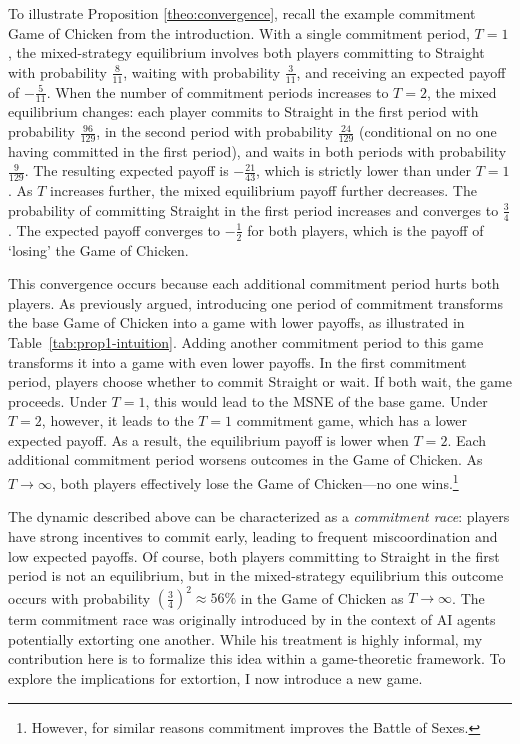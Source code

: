 \documentclass[main.tex]{subfiles}
\begin{document}
To illustrate Proposition \ref{theo:convergence}, recall the example commitment Game of Chicken from the introduction. With a single commitment period, $T = 1$, the mixed-strategy equilibrium involves both players committing to Straight with probability $\tfrac{8}{11}$, waiting with probability $\tfrac{3}{11}$, and receiving an expected payoff of $-\tfrac{5}{11}$. When the number of commitment periods increases to $T = 2$, the mixed equilibrium changes: each player commits to Straight in the first period with probability $\tfrac{96}{129}$, in the second period with probability $\tfrac{24}{129}$ (conditional on no one having committed in the first period), and waits in both periods with probability $\tfrac{9}{129}$. The resulting expected payoff is $-\tfrac{21}{43}$, which is strictly lower than under $T = 1$. As $T$ increases further, the mixed equilibrium payoff further decreases. The probability of committing Straight in the first period increases and converges to $\tfrac{3}{4}$. The expected payoff converges to $-\tfrac{1}{2}$ for both players, which is the payoff of `losing' the Game of Chicken.

This convergence occurs because each additional commitment period hurts both players. As previously argued, introducing one period of commitment transforms the base Game of Chicken into a game with lower payoffs, as illustrated in Table~\ref{tab:prop1-intuition}. Adding another commitment period to this game transforms it into a game with even lower payoffs. In the first commitment period, players choose whether to commit Straight or wait. If both wait, the game proceeds. Under $T = 1$, this would lead to the MSNE of the base game. Under $T = 2$, however, it leads to the $T = 1$ commitment game, which has a lower expected payoff. As a result, the equilibrium payoff is lower when $T=2$. Each additional commitment period worsens outcomes in the Game of Chicken. As $T\to\infty$, both players effectively lose the Game of Chicken—no one wins.\footnote{However, for similar reasons commitment improves the Battle of Sexes.}
 
The dynamic described above can be characterized as a \textit{commitment race}: players have strong incentives to commit early, leading to frequent miscoordination and low expected payoffs. Of course, both players committing to Straight in the first period is not an equilibrium, but in the mixed-strategy equilibrium this outcome occurs with probability $(\tfrac{3}{4})^2 \approx 56\%$ in the Game of Chicken as $T\to\infty$. The term commitment race was originally introduced by \textcite{kokotajlo_commitment_2019} in the context of AI agents potentially extorting one another. While his treatment is highly informal, my contribution here is to formalize this idea within a game-theoretic framework. To explore the implications for extortion, I now introduce a new game.
 
\end{document}
